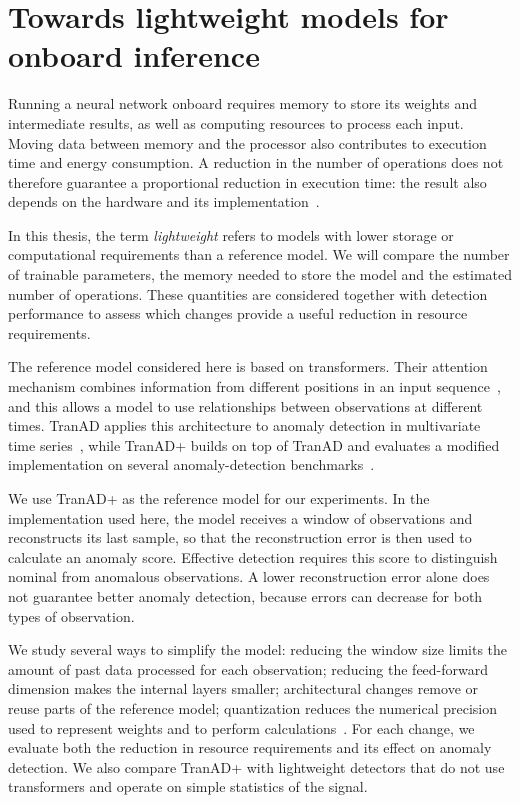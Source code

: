 \section{Towards lightweight models for onboard inference}
\label{sec:introduction-lightweight}

Running a neural network onboard requires memory to store its weights
and intermediate results, as well as computing resources to process each
input. Moving data between memory and the processor also contributes to
execution time and energy consumption. A reduction in the number of
operations does not therefore guarantee a proportional reduction in
execution time: the result also depends on the hardware and its
implementation~\cite{Sze2017EfficientDNN}.

In this thesis, the term \emph{lightweight} refers to models with lower
storage or computational requirements than a reference model. We will compare
the number of trainable parameters, the memory needed to store the model and
the estimated number of operations.
These quantities are considered together with detection performance
to assess which changes provide a useful reduction in resource requirements.

The reference model considered here is based on transformers. Their attention
mechanism combines information from different positions in an input
sequence~\cite{Vaswani2017Attention}, and this allows a model to use relationships
between observations at different times. TranAD applies this architecture
to anomaly detection in multivariate time series~\cite{Tuli2022TranAD}, while
TranAD+ builds on top of TranAD and evaluates a modified implementation on
several anomaly-detection benchmarks~\cite{Yermakov2025TranADPlus}.

We use TranAD+ as the reference model for our experiments. In the
implementation used here, the model receives a window of observations
and reconstructs its last sample, so that the reconstruction error is then used
to calculate an anomaly score. Effective detection requires this score
to distinguish nominal from anomalous observations. A lower reconstruction
error alone does not guarantee better anomaly detection, because errors
can decrease for both types of observation.

We study several ways to simplify the model: reducing the window size
limits the amount of past data processed for each observation; reducing
the feed-forward dimension makes the internal layers smaller;
architectural changes remove or reuse parts of the reference model;
quantization reduces the numerical precision
used to represent weights and to perform
calculations~\cite{Sze2017EfficientDNN}. For each change, we evaluate
both the reduction in resource requirements and its effect on
anomaly detection. We also compare TranAD+ with lightweight detectors
that do not use transformers and operate on simple statistics of the
signal.

